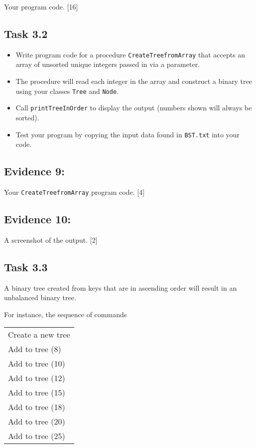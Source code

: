 Your program code. \hfill{}{[}16{]}

\subsection*{Task 3.2 }
\begin{itemize}
\item Write program code for a procedure \texttt{CreateTreefromArray} that
accepts an array of unsorted unique integers passed in via a parameter. 
\item The procedure will read each integer in the array and construct a
binary tree using your classes \texttt{Tree} and \texttt{Node}. 
\item Call \texttt{printTreeInOrder} to display the output (numbers shown
will always be sorted). 
\item Test your program by copying the input data found in \texttt{BST.txt}
into your code. 
\end{itemize}

\subsection*{Evidence 9: }

Your \texttt{CreateTreefromArray} program code. \hfill{}{[}4{]}

\subsection*{Evidence 10: }

A screenshot of the output. \hfill{}{[}2{]}

\subsection*{Task 3.3}

A binary tree created from keys that are in ascending order will result
in an unbalanced binary tree.

For instance, the sequence of commands
\noindent \begin{center}
\begin{tabular}{l}
Create a new tree \tabularnewline
Add to tree (8) \tabularnewline
Add to tree (10) \tabularnewline
Add to tree (12) \tabularnewline
Add to tree (15)\tabularnewline
Add to tree (18) \tabularnewline
Add to tree (20)\tabularnewline
Add to tree (25)\tabularnewline
\end{tabular}
\par\end{center}

